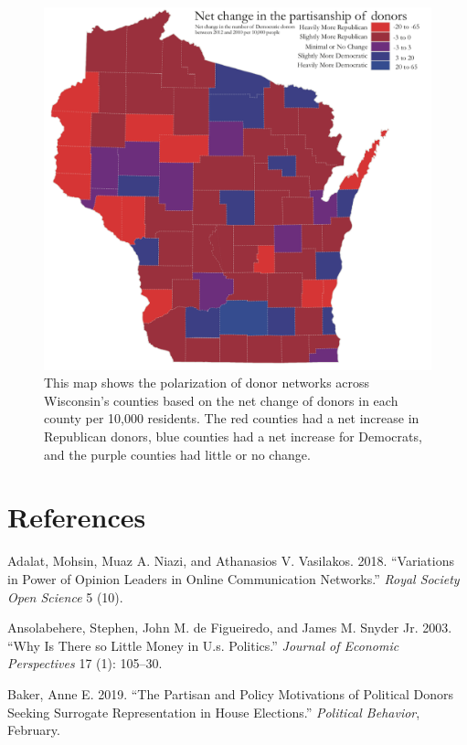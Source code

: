 \documentclass[12pt,]{article}
\begin{document}
\begin{figure}
\includegraphics[width=0.9\linewidth]{../figures/fig5} \caption{This map shows the polarization of donor networks across Wisconsin's counties based on the net change of donors in each county per 10,000 residents. The red counties had a net increase in Republican donors, blue counties had a net increase for Democrats, and the purple counties had little or no change.}\label{fig:unnamed-chunk-15}
\end{figure}

\newpage

\hypertarget{references}{%
\section*{References}\label{references}}

\hypertarget{refs}{}
\leavevmode\hypertarget{ref-adalat2018}{}%
Adalat, Mohsin, Muaz A. Niazi, and Athanasios V. Vasilakos. 2018.
``Variations in Power of Opinion Leaders in Online Communication
Networks.'' \emph{Royal Society Open Science} 5 (10).

\leavevmode\hypertarget{ref-ansolabehere2003}{}%
Ansolabehere, Stephen, John M. de Figueiredo, and James M. Snyder Jr.
2003. ``Why Is There so Little Money in U.s. Politics.'' \emph{Journal
of Economic Perspectives} 17 (1): 105--30.

\leavevmode\hypertarget{ref-baker2019}{}%
Baker, Anne E. 2019. ``The Partisan and Policy Motivations of Political
Donors Seeking Surrogate Representation in House Elections.''
\emph{Political Behavior}, February.
\end{document}
